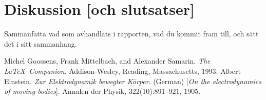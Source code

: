 \documentclass[a4paper,12pt]{article}
\begin{document}
\section{Diskussion [och slutsatser]}
\label{sec:disk}

Sammanfatta vad som avhandlats i rapporten, vad du kommit fram till,
och sätt det i sitt sammanhang. 
%
\begin{thebibliography}{99}
%
Michel Goossens, Frank Mittelbach, and Alexander Samarin. 
\textit{The \LaTeX\ Companion}. 
Addison-Wesley, Reading, Massachusetts, 1993.
%
Albert Einstein. 
\textit{Zur Elektrodynamik bewegter K{\"o}rper}. (German) 
[\textit{On the electrodynamics of moving bodies}]. 
Annalen der Physik, 322(10):891–921, 1905.
%
\end{thebibliography}
%
\end{document}
